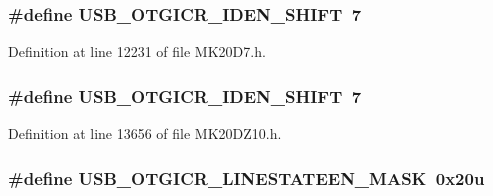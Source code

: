 \subsubsection[{\texorpdfstring{U\+S\+B\+\_\+\+O\+T\+G\+I\+C\+R\+\_\+\+I\+D\+E\+N\+\_\+\+S\+H\+I\+FT}{USB_OTGICR_IDEN_SHIFT}}]{\setlength{\rightskip}{0pt plus 5cm}\#define U\+S\+B\+\_\+\+O\+T\+G\+I\+C\+R\+\_\+\+I\+D\+E\+N\+\_\+\+S\+H\+I\+FT~7}\hypertarget{group___u_s_b___register___masks_ga36d7ef200033a393e023ab06808f7129}{}\label{group___u_s_b___register___masks_ga36d7ef200033a393e023ab06808f7129}


Definition at line 12231 of file M\+K20\+D7.\+h.

\subsubsection[{\texorpdfstring{U\+S\+B\+\_\+\+O\+T\+G\+I\+C\+R\+\_\+\+I\+D\+E\+N\+\_\+\+S\+H\+I\+FT}{USB_OTGICR_IDEN_SHIFT}}]{\setlength{\rightskip}{0pt plus 5cm}\#define U\+S\+B\+\_\+\+O\+T\+G\+I\+C\+R\+\_\+\+I\+D\+E\+N\+\_\+\+S\+H\+I\+FT~7}\hypertarget{group___u_s_b___register___masks_ga36d7ef200033a393e023ab06808f7129}{}\label{group___u_s_b___register___masks_ga36d7ef200033a393e023ab06808f7129}


Definition at line 13656 of file M\+K20\+D\+Z10.\+h.

\subsubsection[{\texorpdfstring{U\+S\+B\+\_\+\+O\+T\+G\+I\+C\+R\+\_\+\+L\+I\+N\+E\+S\+T\+A\+T\+E\+E\+N\+\_\+\+M\+A\+SK}{USB_OTGICR_LINESTATEEN_MASK}}]{\setlength{\rightskip}{0pt plus 5cm}\#define U\+S\+B\+\_\+\+O\+T\+G\+I\+C\+R\+\_\+\+L\+I\+N\+E\+S\+T\+A\+T\+E\+E\+N\+\_\+\+M\+A\+SK~0x20u}\hypertarget{group___u_s_b___register___masks_gac9d12e9bdf0d60b52ea0b99c668630af}{}\label{group___u_s_b___register___masks_gac9d12e9bdf0d60b52ea0b99c668630af}



